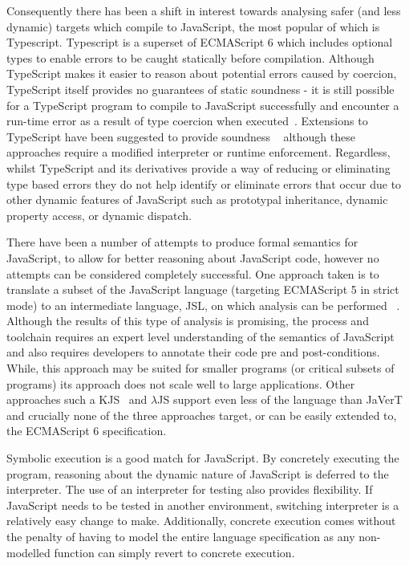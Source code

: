 \documentclass[]{final_report}
\begin{document}
Consequently there has been a shift in interest towards analysing safer (and less dynamic) targets which compile to JavaScript, the most popular of which is Typescript. Typescript is a superset of ECMAScript 6 which includes optional types to enable errors to be caught statically before compilation. Although TypeScript makes it easier to reason about potential errors caused by coercion, TypeScript itself provides no guarantees of static soundness - it is still possible for a TypeScript program to compile to JavaScript successfully and encounter a run-time error as a result of type coercion when executed~\cite{bierman2014understanding}. Extensions to TypeScript have been suggested to provide soundness ~\cite{richards2015concrete, DBLP:conf/popl/2015} although these approaches require a modified interpreter or runtime enforcement. Regardless, whilst TypeScript and its derivatives provide a way of reducing or eliminating type based errors they do not help identify or eliminate errors that occur due to other dynamic features of JavaScript such as prototypal inheritance, dynamic property access, or dynamic dispatch.

There have been a number of attempts to produce formal semantics for JavaScript, to allow for better reasoning about JavaScript code, however no attempts can be considered completely successful. One approach taken is to translate a subset of the JavaScript language (targeting ECMAScript 5 in strict mode) to an intermediate language, JSL, on which analysis can be performed ~\cite{gardner2012towards}. Although the results of this type of analysis is promising, the process and toolchain requires an expert level understanding of the semantics of JavaScript and also requires developers to annotate their code pre and post-conditions. While, this approach may be suited for smaller programs (or critical subsets of programs) its approach does not scale well to large applications. Other approaches such a KJS~\cite{park2015kjs} and \ensuremath{\lambda}JS\cite{guha2010essence} support even less of the language than JaVerT and crucially none of the three approaches target, or can be easily extended to, the ECMAScript 6 specification.

Symbolic execution is a good match for JavaScript. By concretely executing the program, reasoning about the dynamic nature of JavaScript is deferred to the interpreter. The use of an interpreter for testing also provides flexibility. If JavaScript needs to be tested in another environment, switching interpreter is a relatively easy change to make. Additionally, concrete execution comes without the penalty of having to model the entire language specification as any non-modelled function can simply revert to concrete execution.
\end{document}
